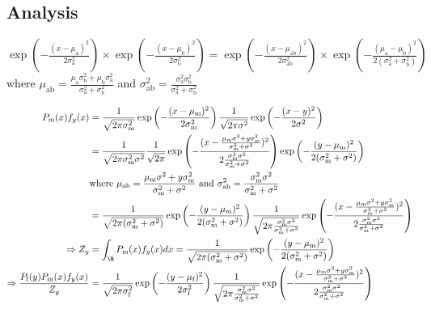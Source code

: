 \documentclass{article}\usepackage[]{graphicx}\usepackage[]{color}
\newcommand{\x}[1]{\text{#1}}
\begin{document}
\subsection{Analysis} 
\begin{claim} \label{norm_prod} $\exp\left(-\frac{(x-\mu_\text{a})^2}{2\sigma_\text{a}^2}\right)\times \exp\left(-\frac{(x-\mu_\text{b})^2}{2\sigma_\text{b}^2}\right)=\exp\left(-\frac{(x-\mu_\text{ab})^2}{2\sigma_\text{ab}^2}\right)\times\exp\left(-\frac{(\mu_\text{a}-\mu_\text{b})^2}{2(\sigma_\text{a}^2+\sigma_\text{b}^2)}\right)$ where $\mu_\text{ab}=\frac{\mu_\text{a}\sigma_\text{b}^2+\mu_\text{b}\sigma_\text{a}^2}{\sigma_\text{a}^2+\sigma_b^2}$ and $\sigma_\text{ab}^2=\frac{\sigma_\text{a}^2\sigma_\text{b}^2}{\sigma_\text{a}^2+\sigma_\text{b}^2}$
\end{claim}
\begin{landscape}
\begin{align*}
P_\text{m}(x)f_y(x)&=\frac{1}{\sqrt{2\pi\sigma_\text{m}^2}}\exp\left(-\frac{(x-\mu_\x{m})^2}{2\sigma_\text{m}^2}\right)\frac{1}{\sqrt{2\pi\sigma^2}}\exp\left(-\frac{(x-y)^2}{2\sigma^2}\right)
\\&=\frac{1}{\sqrt{2\pi\sigma_\x{m}^2\sigma^2}}\frac{1}{\sqrt{2\pi}}\exp\left(-\frac{(x-\frac{\mu_\x{m}\sigma^2+y\sigma_\x{m}^2}{\sigma_\x{m}^2+\sigma^2})^2}{2\frac{\sigma_\x{m}^2\sigma^2}{\sigma_\x{m}^2+\sigma^2}}\right)\exp\left(-\frac{(y-\mu_\x{m})^2}{2(\sigma_\x{m}^2+\sigma^2)}\right)
\\ &\x{where } \mu_\x{ab}=\frac{\mu_\x{m}\sigma^2+y\sigma_\x{m}^2}{\sigma_\x{m}^2+\sigma^2} \x{ and } \sigma_\x{ab}^2=\frac{\sigma_\x{m}^2\sigma^2}{\sigma_\x{m}^2+\sigma^2}
\\ &=\frac{1}{\sqrt{2\pi(\sigma_\x{m}^2+\sigma^2)}}\exp\left(-\frac{(y-\mu_\x{m})^2}{2(\sigma_\x{m}^2+\sigma^2)}\right)\frac{1}{\sqrt{2\pi\frac{\sigma_\x{m}^2\sigma^2}{\sigma_\x{m}^2+\sigma^2}}}\exp\left(-\frac{(x-\frac{\mu_\x{m}\sigma^2+y\sigma_\x{m}^2}{\sigma_\x{m}^2+\sigma^2})^2}{2\frac{\sigma_\x{m}^2\sigma^2}{\sigma_\x{m}^2+\sigma^2}}\right)
\\\Rightarrow Z_y&=\int_\R P_\x{m}(x)f_y(x)dx = \frac{1}{\sqrt{2\pi(\sigma_\x{m}^2+\sigma^2)}}\exp\left(-\frac{(y-\mu_\x{m})^2}{2(\sigma_\x{m}^2+\sigma^2)}\right)
\\ \Rightarrow \frac{P_\x{f}(y)P_\x{m}(x)f_y(x)}{Z_y}&=\frac{1}{\sqrt{2\pi\sigma_\x{f}^2}}\exp\left(-\frac{(y-\mu_\x{f})^2}{2\sigma_\x{f}^2}\right)\frac{1}{\sqrt{2\pi\frac{\sigma_\x{m}^2\sigma^2}{\sigma_\x{m}^2+\sigma^2}}}\exp\left(-\frac{(x-\frac{\mu_\x{m}\sigma^2+y\sigma_\x{m}^2}{\sigma_\x{m}^2+\sigma^2})^2}{2\frac{\sigma_\x{m}^2\sigma^2}{\sigma_\x{m}^2+\sigma^2}}\right)

\end{align*}
\end{landscape}
\end{document}

